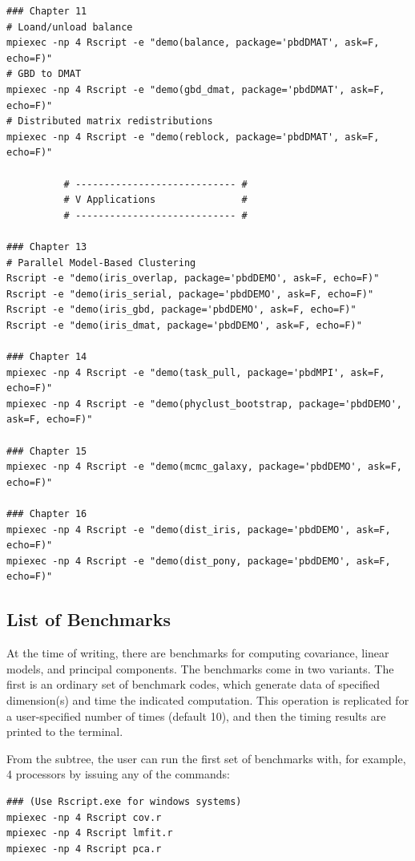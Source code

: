 \begin{lstlisting}[title=List of Demos]
### Chapter 11
# Loand/unload balance
mpiexec -np 4 Rscript -e "demo(balance, package='pbdDMAT', ask=F, echo=F)"
# GBD to DMAT
mpiexec -np 4 Rscript -e "demo(gbd_dmat, package='pbdDMAT', ask=F, echo=F)"
# Distributed matrix redistributions
mpiexec -np 4 Rscript -e "demo(reblock, package='pbdDMAT', ask=F, echo=F)"

		  # ---------------------------- #
		  # V Applications               #
		  # ---------------------------- #

### Chapter 13
# Parallel Model-Based Clustering
Rscript -e "demo(iris_overlap, package='pbdDEMO', ask=F, echo=F)"
Rscript -e "demo(iris_serial, package='pbdDEMO', ask=F, echo=F)"
Rscript -e "demo(iris_gbd, package='pbdDEMO', ask=F, echo=F)"
Rscript -e "demo(iris_dmat, package='pbdDEMO', ask=F, echo=F)"

### Chapter 14
mpiexec -np 4 Rscript -e "demo(task_pull, package='pbdMPI', ask=F, echo=F)"
mpiexec -np 4 Rscript -e "demo(phyclust_bootstrap, package='pbdDEMO', ask=F, echo=F)"

### Chapter 15
mpiexec -np 4 Rscript -e "demo(mcmc_galaxy, package='pbdDEMO', ask=F, echo=F)"

### Chapter 16
mpiexec -np 4 Rscript -e "demo(dist_iris, package='pbdDEMO', ask=F, echo=F)"
mpiexec -np 4 Rscript -e "demo(dist_pony, package='pbdDEMO', ask=F, echo=F)"

\end{lstlisting}





\subsection{List of Benchmarks}

At the time of writing, there are benchmarks for computing covariance, linear
models, and principal components. The benchmarks come in two variants. The
first is an ordinary set of benchmark codes, which generate data of specified
dimension(s) and time the indicated computation. This operation is replicated
for a user-specified number of times (default 10), and then the timing results
are printed to the terminal.  

From the  subtree, the user can run the first set of
benchmarks with, for example, 4 processors by issuing any of the commands:
\begin{lstlisting}
### (Use Rscript.exe for windows systems)
mpiexec -np 4 Rscript cov.r
mpiexec -np 4 Rscript lmfit.r
mpiexec -np 4 Rscript pca.r
\end{lstlisting}

